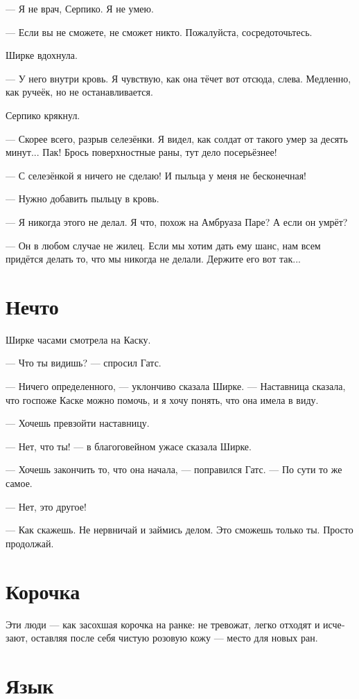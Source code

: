 \documentclass[a4paper,12pt,fleqn]{book}\usepackage{polyglossia}\setdefaultlanguage[babelshorthands=true]{russian}\setotherlanguage{english}\defaultfontfeatures{Ligatures=TeX,Mapping=tex-text}\usepackage{xcolor}\newcommand{\ml}[3]{#2}
\begin{document}
--- Я не врач, Серпико.
Я не умею.

--- Если вы не сможете, не сможет никто.
Пожалуйста, сосредоточьтесь.

Ширке вдохнула.

--- У него внутри кровь.
Я чувствую, как она тёчет вот отсюда, слева.
Медленно, как ручеёк, но не останавливается.

Серпико крякнул.

--- Скорее всего, разрыв селезёнки.
Я видел, как солдат от такого умер за десять минут...
Пак!
Брось поверхностные раны, тут дело посерьёзнее!

--- С селезёнкой я ничего не сделаю!
И пыльца у меня не бесконечная!

--- Нужно добавить пыльцу в кровь.

--- Я никогда этого не делал.
Я что, похож на Амбруаза Паре?
А если он умрёт?

--- Он в любом случае не жилец.
Если мы хотим дать ему шанс, нам всем придётся делать то, что мы никогда не делали.
Держите его вот так...

\section{Нечто}

Ширке часами смотрела на Каску.

--- Что ты видишь? --- спросил Гатс.

--- Ничего определенного, --- уклончиво сказала Ширке.
--- Наставница сказала, что госпоже Каске можно помочь, и я хочу понять, что она имела в виду.

--- Хочешь превзойти наставницу.

--- Нет, что ты! --- в благоговейном ужасе сказала Ширке.

--- Хочешь закончить то, что она начала, --- поправился Гатс.
--- По сути то же самое.

--- Нет, это другое!

--- Как скажешь.
Не нервничай и займись делом.
Это сможешь только ты.
Просто продолжай.

\section{Корочка}

Эти люди --- как засохшая корочка на ранке: не тревожат, легко отходят и исчезают, оставляя после себя чистую розовую кожу --- место для новых ран.

\section{Язык}
\end{document}
